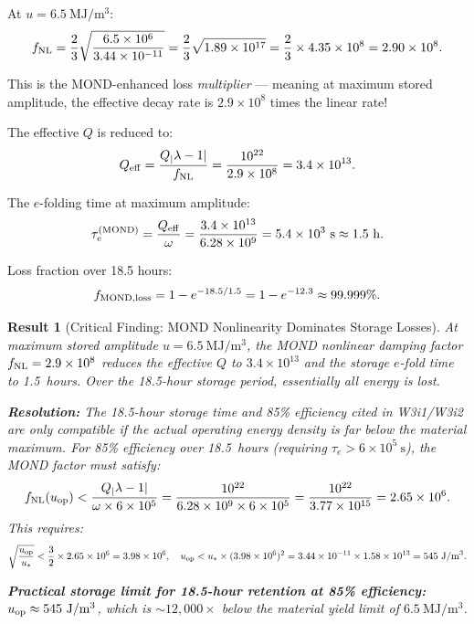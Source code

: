 \documentclass[aps,prd,twocolumn,superscriptaddress]{revtex4-2}
\newcommand{\lam}{|\lambda-1|}
\newtheorem{result}{Result}
\begin{document}
At $u = 6.5~\mathrm{MJ/m^3}$:
\begin{equation}
f_{\rm NL} = \frac{2}{3}\sqrt{\frac{6.5\times 10^6}{3.44\times 10^{-11}}}
= \frac{2}{3}\sqrt{1.89\times 10^{17}}
= \frac{2}{3}\times 4.35\times 10^8 = 2.90\times 10^8.
\end{equation}

This is the MOND-enhanced loss \emph{multiplier} --- meaning at
maximum stored amplitude, the effective decay rate is
$2.9\times 10^8$ times the linear rate!

The effective $Q$ is reduced to:
\begin{equation}
Q_{\rm eff} = \frac{Q_\lam}{f_{\rm NL}}
= \frac{10^{22}}{2.9\times 10^8} = 3.4\times 10^{13}.
\end{equation}

The $e$-folding time at maximum amplitude:
\begin{equation}
\tau_e^{(\rm MOND)} = \frac{Q_{\rm eff}}{\omega}
= \frac{3.4\times 10^{13}}{6.28\times 10^9} = 5.4\times 10^3~\mathrm{s} \approx 1.5~\mathrm{h}.
\end{equation}

Loss fraction over 18.5 hours:
\begin{equation}
f_{\rm MOND,loss} = 1 - e^{-18.5/1.5} = 1 - e^{-12.3} \approx 99.999\%.
\end{equation}

\begin{result}[Critical Finding: MOND Nonlinearity Dominates Storage Losses]
At maximum stored amplitude $u = 6.5~\mathrm{MJ/m^3}$, the MOND
nonlinear damping factor $f_{\rm NL} = 2.9\times 10^8$ reduces the
effective $Q$ to $3.4\times 10^{13}$ and the storage $e$-fold time
to 1.5~hours.  Over the 18.5-hour storage period, essentially all
energy is lost.

\textbf{Resolution:} The 18.5-hour storage time and 85\% efficiency
cited in W3i1/W3i2 are only compatible if the actual operating
energy density is far below the material maximum.  For 85\% efficiency
over 18.5~hours (requiring $\tau_e > 6\times 10^5~\mathrm{s}$),
the MOND factor must satisfy:
\begin{equation}
f_{\rm NL}(u_{\rm op}) < \frac{Q_\lam}{\omega\times 6\times 10^5}
= \frac{10^{22}}{6.28\times 10^9\times 6\times 10^5}
= \frac{10^{22}}{3.77\times 10^{15}} = 2.65\times 10^6.
\end{equation}
This requires:
\begin{equation}
\sqrt{\frac{u_{\rm op}}{u_*}} < \frac{3}{2}\times 2.65\times 10^6 = 3.98\times 10^6,
\quad u_{\rm op} < u_*\times(3.98\times 10^6)^2 = 3.44\times 10^{-11}
\times 1.58\times 10^{13} = 545~\mathrm{J/m^3}.
\end{equation}

\textbf{Practical storage limit for 18.5-hour retention at 85\% efficiency:
$u_{\rm op} \approx 545~\mathrm{J/m^3}$}, which is $\sim 12{,}000\times$
below the material yield limit of $6.5~\mathrm{MJ/m^3}$.
\end{result}
\end{document}
